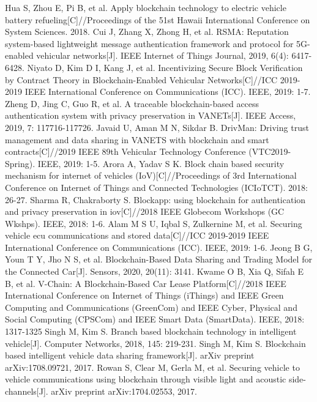 \begin{thebibliography}{99}
 Hua S, Zhou E, Pi B, et al. Apply blockchain technology to electric vehicle battery refueling[C]//Proceedings of the 51st Hawaii International Conference on System Sciences. 2018.
 Cui J, Zhang X, Zhong H, et al. RSMA: Reputation system-based lightweight message authentication framework and protocol for 5G-enabled vehicular networks[J]. IEEE Internet of Things Journal, 2019, 6(4): 6417-6428.
 Niyato D, Kim D I, Kang J, et al. Incentivizing Secure Block Verification by Contract Theory in Blockchain-Enabled Vehicular Networks[C]//ICC 2019-2019 IEEE International Conference on Communications (ICC). IEEE, 2019: 1-7.
 Zheng D, Jing C, Guo R, et al. A traceable blockchain-based access authentication system with privacy preservation in VANETs[J]. IEEE Access, 2019, 7: 117716-117726.
 Javaid U, Aman M N, Sikdar B. DrivMan: Driving trust management and data sharing in VANETS with blockchain and smart contracts[C]//2019 IEEE 89th Vehicular Technology Conference (VTC2019-Spring). IEEE, 2019: 1-5.
 Arora A, Yadav S K. Block chain based security mechanism for internet of vehicles (IoV)[C]//Proceedings of 3rd International Conference on Internet of Things and Connected Technologies (ICIoTCT). 2018: 26-27.
 Sharma R, Chakraborty S. Blockapp: using blockchain for authentication and privacy preservation in iov[C]//2018 IEEE Globecom Workshops (GC Wkshps). IEEE, 2018: 1-6.
 Alam M S U, Iqbal S, Zulkernine M, et al. Securing vehicle ecu communications and stored data[C]//ICC 2019-2019 IEEE International Conference on Communications (ICC). IEEE, 2019: 1-6.
 Jeong B G, Youn T Y, Jho N S, et al. Blockchain-Based Data Sharing and Trading Model for the Connected Car[J]. Sensors, 2020, 20(11): 3141.
 Kwame O B, Xia Q, Sifah E B, et al. V-Chain: A Blockchain-Based Car Lease Platform[C]//2018 IEEE International Conference on Internet of Things (iThings) and IEEE Green Computing and Communications (GreenCom) and IEEE Cyber, Physical and Social Computing (CPSCom) and IEEE Smart Data (SmartData). IEEE, 2018: 1317-1325
 Singh M, Kim S. Branch based blockchain technology in intelligent vehicle[J]. Computer Networks, 2018, 145: 219-231.
 Singh M, Kim S. Blockchain based intelligent vehicle data sharing framework[J]. arXiv preprint arXiv:1708.09721, 2017.
 Rowan S, Clear M, Gerla M, et al. Securing vehicle to vehicle communications using blockchain through visible light and acoustic side-channels[J]. arXiv preprint arXiv:1704.02553, 2017.

\end{thebibliography}
